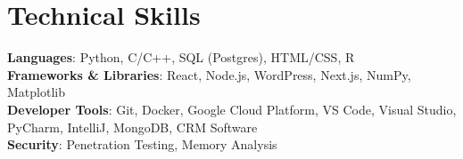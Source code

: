 \documentclass[letterpaper,11pt]{article}
\begin{document}
%
\section{Technical Skills}
 \begin{itemize}[leftmargin=0.15in, label={}]
    \small{\item{
     \textbf{Languages}{: Python, C/C++, SQL (Postgres), HTML/CSS, R} \\
     \textbf{Frameworks \& Libraries}{: React, Node.js, WordPress, Next.js, NumPy, Matplotlib} \\
     \textbf{Developer Tools}{: Git, Docker, Google Cloud Platform, VS Code, Visual Studio, PyCharm, IntelliJ, MongoDB, CRM Software} \\
     \textbf{Security}{: Penetration Testing, Memory Analysis}
    }}
 \end{itemize}


\end{document}
